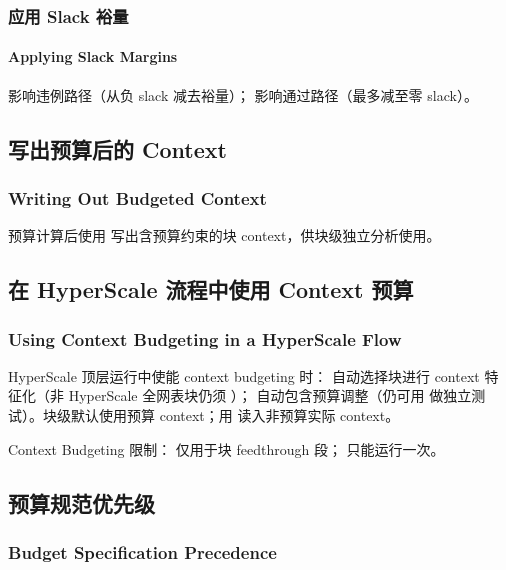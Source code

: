 \subsubsection{应用 Slack 裕量}
\paragraph*{Applying Slack Margins}

 影响违例路径（从负 slack 减去裕量）； 影响通过路径（最多减至零 slack）。

\subsection{写出预算后的 Context}
\subsubsection*{Writing Out Budgeted Context}

预算计算后使用  写出含预算约束的块 context，供块级独立分析使用。

\subsection{在 HyperScale 流程中使用 Context 预算}
\subsubsection*{Using Context Budgeting in a HyperScale Flow}

HyperScale 顶层运行中使能 context budgeting 时： 自动选择块进行 context 特征化（非 HyperScale 全网表块仍须 ）； 自动包含预算调整（仍可用  做独立测试）。块级默认使用预算 context；用  读入非预算实际 context。

\begin{noteBox}
Context Budgeting 限制： 仅用于块 feedthrough 段； 只能运行一次。
\end{noteBox}

\subsection{预算规范优先级}
\subsubsection*{Budget Specification Precedence}

